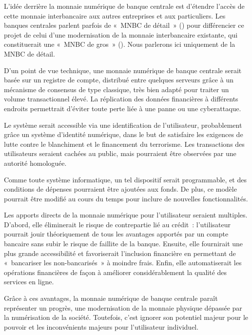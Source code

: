 L'idée derrière la monnaie numérique de banque centrale est d'étendre l'accès de cette monnaie interbancaire aux autres entreprises et aux particuliers. Les banques centrales parlent parfois de «~MNBC de détail~» () pour différencier ce projet de celui d'une modernisation de la monnaie interbancaire existante, qui constituerait une «~MNBC de gros~» (). Nous parlerons ici uniquement de la MNBC de détail.


D'un point de vue technique, une monnaie numérique de banque centrale serait basée sur un registre de compte, distribué entre quelques serveurs grâce à un mécanisme de consensus de type classique, très bien adapté pour traiter un volume transactionnel élevé. La réplication des données financières à différents endroits permettrait d'éviter toute perte liée à une panne ou une cyberattaque.

Le système serait accessible via une identification de l'utilisateur, probablement grâce un système d'identité numérique, dans le but de satisfaire les exigences de lutte contre le blanchiment et le financement du terrorisme. Les transactions des utilisateurs seraient cachées au public, mais pourraient être observées par une autorité homologuée.

Comme toute système informatique, un tel dispositif serait programmable, et des conditions de dépenses pourraient être ajoutées aux fonds. De plus, ce modèle pourrait être modifié au cours du temps pour inclure de nouvelles fonctionnalités.

Les apports directs de la monnaie numérique pour l'utilisateur seraient multiples. D'abord, elle éliminerait le risque de contrepartie lié au crédit~: l'utilisateur pourrait jouir théoriquement de tous les avantages apportés par un compte bancaire sans subir le risque de faillite de la banque. Ensuite, elle fournirait une plus grande accessibilité et favoriserait l'inclusion financière en permettant de «~bancariser les non-bancarisés~» à moindre frais. Enfin, elle automatiserait les opérations financières de façon à améliorer considérablement la qualité des services en ligne.

Grâce à ces avantages, la monnaie numérique de banque centrale paraît représenter un progrès, une modernisation de la monnaie physique dépassée par la numérisation de la société. Toutefois, c'est ignorer son potentiel majeur pour le pouvoir et les inconvénients majeurs pour l'utilisateur individuel.

